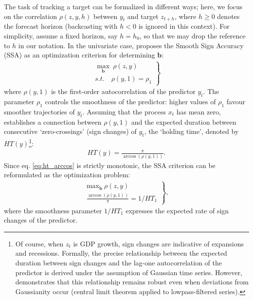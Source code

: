 \documentclass[11pt,a4paper]{article}
\begin{document}
The task of tracking a target can be formalized in different ways; here, we focus on the correlation $\rho(z,y,h)$ between $y_t$ and target $z_{t+h}$, where $h\geq 0$ denotes the forecast horizon (backcasting with $h<0$ is ignored in this context). For simplicity, assume a fixed horizon, say $h=h_0$, so that we may drop the reference to $h$ in our notation. In the univariate case, \cite{Wildi2025} proposes the Smooth Sign Accuracy (SSA) as an optimization criterion for determining $\mathbf{b}$:
\begin{eqnarray}\label{critssa}
\left.\begin{array}{c}\max_{\mathbf{b}}~\rho(z,y)\\
s.t. \quad \rho(y,1)=\rho_1\end{array}\right\}
\end{eqnarray}
where $\rho(y,1)$ is the first-order autocorrelation of the predictor $y_t$. The parameter $\rho_1$ controls the smoothness of the predictor: higher values of $\rho_1$ favour smoother trajectories of $y_t$. Assuming that the process $x_t$ has mean zero, \cite{Wildi2024} establishes a connection between $\rho(y,1)$ and the expected duration between consecutive `zero-crossings' (sign changes) of $y_t$, the `holding time', denoted by $HT(y)$\footnote{Of course, when $z_t$ is GDP growth, sign changes are indicative of expansions and recessions. Formally, the precise relationship between the expected duration between sign changes and the lag-one autocorrelation of the predictor is derived under the assumption of Gaussian time series. However, \cite{Wildi2024} demonstrates that this relationship remains robust even when deviations from Gaussianity occur (central limit theorem applied to lowpass-filtered series).}:
\begin{eqnarray}\label{ht}
HT(y)=\frac{\pi}{\arccos(\rho(y,1))}.
\label{eq:ht_arccos}
\end{eqnarray}
Since eq. \eqref{eq:ht_arccos} is strictly monotonic, the SSA criterion can be reformulated as the optimization problem:
\begin{eqnarray}\label{critssaht}
\left.\begin{array}{c}\textrm{max}_{\mathbf{b}}~\rho(z,y)\\
\frac{\arccos(\rho(y,1))}{\pi}=1/HT_1\end{array}\right\},
\end{eqnarray}
where the smoothness parameter $1/HT_1$ expresses the expected rate of sign changes of the predictor. \\
\end{document}
